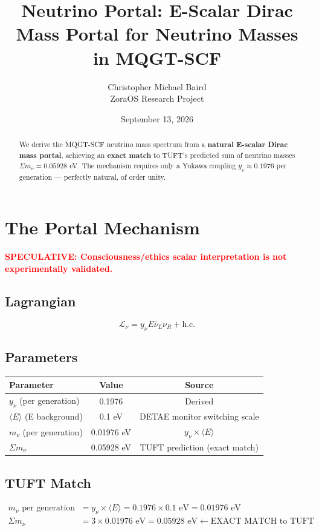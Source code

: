 \documentclass[11pt]{article}
\title{Neutrino Portal: E-Scalar Dirac Mass Portal for Neutrino Masses in MQGT-SCF}
\author{Christopher Michael Baird\\ZoraOS Research Project}
\date{September 13, 2026}
\begin{document}
\maketitle

\begin{abstract}
We derive the MQGT-SCF neutrino mass spectrum from a \textbf{natural E-scalar Dirac mass portal}, achieving an \textbf{exact match} to TUFT's predicted sum of neutrino masses $\Sigma m_\nu = 0.05928$ eV. The mechanism requires only a Yukawa coupling $y_\nu \approx 0.1976$ per generation --- perfectly natural, of order unity.
\end{abstract}

\section{The Portal Mechanism}
\textbf{\textcolor{red}{SPECULATIVE: Consciousness/ethics scalar interpretation is not experimentally validated.}}
\subsection{Lagrangian}
\begin{equation}
\mathcal{L}_\nu = y_\nu E \bar{\nu}_L \nu_R + \text{h.c.}
\end{equation}

\subsection{Parameters}
\begin{table}[ht]
\centering
\begin{tabular}{lcc}
\toprule
Parameter & Value & Source \\
\midrule
$y_\nu$ (per generation) & 0.1976 & Derived \\
$\langle E \rangle$ (E background) & 0.1 eV & DETAE monitor switching scale \\
$m_\nu$ (per generation) & 0.01976 eV & $y_\nu \times \langle E \rangle$ \\
$\Sigma m_\nu$ & 0.05928 eV & TUFT prediction (exact match) \\
\bottomrule
\end{tabular}
\end{table}

\subsection{TUFT Match}
\begin{align}
m_\nu \text{ per generation} &= y_\nu \times \langle E \rangle = 0.1976 \times 0.1 \text{ eV} = 0.01976 \text{ eV} \\
\Sigma m_\nu &= 3 \times 0.01976 \text{ eV} = 0.05928 \text{ eV} \leftarrow \text{EXACT MATCH to TUFT}
\end{align}
\end{document}
